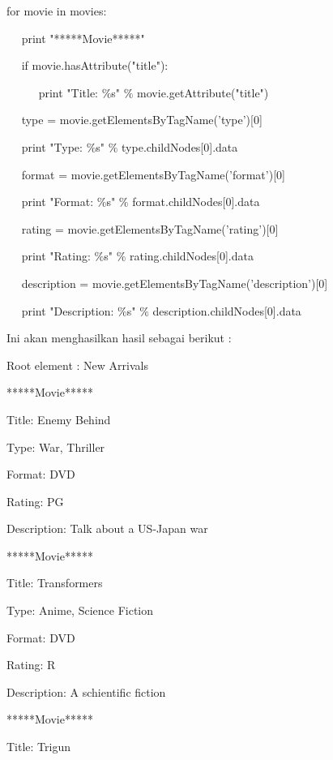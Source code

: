 \documentclass{wileySix}
\begin{document}
\begin{myEnumerate}
\begin{myEnumerate}
{\noindent 
for movie in movies: \par
\noindent 
~~ print "*****Movie*****" \par
\noindent 
~~ if movie.hasAttribute("title"): \par
\noindent 
~~~~~ print "Title:  $  \%  $s"  $  \%  $ movie.getAttribute("title") \par
\vspace{12pt}
\noindent 
~~ type = movie.getElementsByTagName('type')[0] \par
\noindent 
~~ print "Type:  $  \%  $s"  $  \%  $ type.childNodes[0].data \par
\noindent 
~~ format = movie.getElementsByTagName('format')[0] \par
\noindent 
~~ print "Format:  $  \%  $s"  $  \%  $ format.childNodes[0].data \par
\noindent 
~~ rating = movie.getElementsByTagName('rating')[0] \par
\noindent 
~~ print "Rating:  $  \%  $s"  $  \%  $ rating.childNodes[0].data \par
\noindent 
~~ description = movie.getElementsByTagName('description')[0] \par
\noindent 
~~ print "Description:  $  \%  $s"  $  \%  $ description.childNodes[0].data \par
\vspace{12pt}
\noindent 
Ini akan menghasilkan hasil sebagai berikut : \par
\noindent 
Root element : New Arrivals \par
\noindent 
*****Movie***** \par
\noindent 
Title: Enemy Behind \par
\noindent 
Type: War, Thriller \par
\noindent 
Format: DVD \par
\noindent 
Rating: PG \par
\noindent 
Description: Talk about a US-Japan war \par
\noindent 
*****Movie***** \par
\noindent 
Title: Transformers \par
\noindent 
Type: Anime, Science Fiction \par
\noindent 
Format: DVD \par
\noindent 
Rating: R \par
\noindent 
Description: A schientific fiction \par
\noindent 
*****Movie***** \par
\noindent 
Title: Trigun \par
}
\end{myEnumerate}
\end{myEnumerate}
\end{document}
